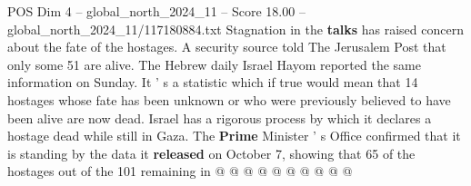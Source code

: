 \begin{textsample}{POS Dim 4 – global\_north\_2024\_11 – Score 18.00 – global\_north\_2024\_11/117180884.txt}
Stagnation in the \textbf{talks} has raised concern about the fate of the hostages.
A security source told The Jerusalem Post that only some 51 are alive.
The Hebrew daily Israel Hayom reported the same information on Sunday.
It ' s a statistic which if true would mean that 14 hostages whose fate has been unknown or who were previously believed to have been alive are now dead.
Israel has a rigorous process by which it declares a hostage dead while still in Gaza.
The \textbf{Prime} Minister ' s Office confirmed that it is standing by the data it \textbf{released} on October 7, showing that 65 of the hostages out of the 101 remaining in @ @ @ @ @ @ @ @ @ @

\end{textsample}
